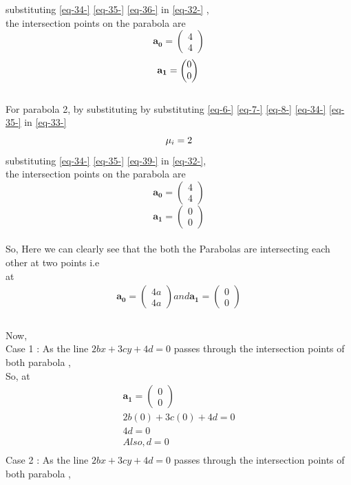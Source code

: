 \documentclass[journal,12pt,twocolumn]{IEEEtran}
\newcommand{\myvec}[1]{\ensuremath{\begin{pmatrix}#1\end{pmatrix}}}
\let\vec\mathbf
\let\vec\mathbf
\begin{document}
{substituting \eqref{eq-34-} \eqref{eq-35-} \eqref{eq-36-} in \eqref{eq-32-} ,\\
the intersection points on the parabola are
\begin{equation}
\vec{a_0}=\myvec{4\\4}
\end{equation}
\begin{equation}
\vec{a_1}=\myvec{0\\0} \\ 
\end{equation}\\
For parabola 2,
by substituting by substituting \eqref{eq-6-} \eqref{eq-7-} \eqref{eq-8-} \eqref{eq-34-} \eqref{eq-35-}  in  \eqref{eq-33-}
\begin{equation}
\mu_i=2
\label{eq-39-} \\ 
\end{equation}
substituting \eqref{eq-34-} \eqref{eq-35-} \eqref{eq-39-} in \eqref{eq-32-},\\
the intersection points on the parabola are
\begin{equation}
\vec{a_0}=\myvec{4\\4}
\end{equation}
\begin{equation}
\vec{a_1}=\myvec{0\\0}
\end{equation}\\
So, Here we can clearly see that the both the Parabolas are intersecting each other at two points i.e \\
at  \begin{align}
\vec{a_0}=\myvec{4a\\4a} and \vec{a_1}=\myvec{0\\0} \\
\end{align}
\\
Now,\\
Case 1 :
As the line $ 2bx+3cy+4d = 0$ passes through the intersection points of both parabola ,\\
So, at \\
\begin{align}
\vec{a_1}=\myvec{0\\0}
\\
 2b(0)+3c(0)+4d = 0 \\
  4d =0  \\
Also , d = 0\\
\end{align}
Case 2 :
As the line $ 2bx+3cy+4d = 0$ passes through the intersection points of both parabola ,\\
}
\end{document}
